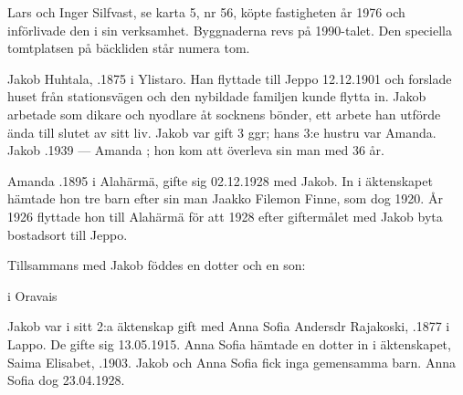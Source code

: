 

Lars och Inger Silfvast, se karta 5, nr 56, köpte fastigheten år 1976 och införlivade den i sin verksamhet. Byggnaderna revs på 1990-talet. Den speciella tomtplatsen på bäckliden står numera tom.



Jakob Huhtala, .1875 i Ylistaro. Han flyttade till Jeppo 12.12.1901 och forslade huset från stationsvägen och den nybildade familjen kunde flytta in. Jakob  arbetade som dikare och nyodlare åt socknens bönder, ett arbete han utförde ända till slutet av sitt liv. Jakob var gift 3 ggr; hans 3:e hustru var Amanda.
Jakob .1939  ---  Amanda ; hon kom att överleva sin man med 36 år.

Amanda .1895 i Alahärmä, gifte sig 02.12.1928 med Jakob. In i äktenskapet hämtade hon tre barn efter sin man Jaakko Filemon Finne, som dog 1920. År 1926 flyttade hon till Alahärmä för att 1928 efter giftermålet med Jakob byta bostadsort till Jeppo.
\begin{jhchildren}
  \item {}
  \item {}
  \item {}
\end{jhchildren}
Tillsammans med Jakob föddes en dotter och en son:
  \begin{jhchildren}
    \item {} i Oravais
    \item {}
\end{jhchildren}


Jakob var i sitt 2:a äktenskap gift  med Anna Sofia Andersdr Rajakoski, .1877 i Lappo. De gifte sig 13.05.1915. Anna Sofia hämtade en dotter in i äktenskapet, Saima Elisabet, .1903. Jakob och Anna Sofia fick inga gemensamma barn. Anna Sofia dog  23.04.1928.

